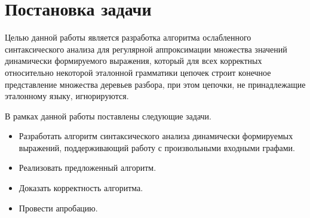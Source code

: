 \section{Постановка задачи}
Целью данной работы является разработка алгоритма ослабленного синтаксического 
анализа для регулярной аппроксимации множества значений динамически формируемого
выражения, который для всех корректных относительно некоторой эталонной 
грамматики цепочек строит конечное представление множества деревьев разбора, при
этом цепочки, не принадлежащие эталонному языку, игнорируются.

В рамках данной работы поставлены следующие задачи.
\begin{itemize}
  \item Разработать алгоритм синтаксического анализа динамически формируемых 
        выражений, поддерживающий работу с произвольными входными графами.
  \item Реализовать предложенный алгоритм.
  \item Доказать корректность алгоритма.
  \item Провести апробацию.
\end{itemize}
